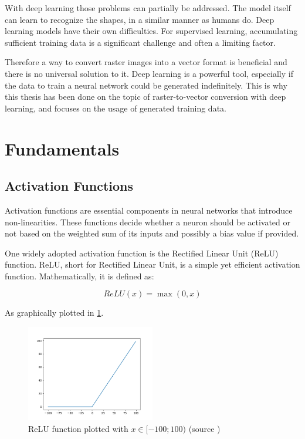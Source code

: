 \documentclass[12pt, a4paper, titlepage]{report}
\begin{document}
With deep learning those problems can partially be addressed. The model itself can learn to recognize the shapes, in a similar manner as humans do. Deep learning models have their own difficulties. For supervised learning, accumulating sufficient training data is a significant challenge and often a limiting factor.

Therefore a way to convert raster images into a vector format is beneficial and there is no universal solution to it. Deep learning is a powerful tool, especially if the data to train a neural network could be generated indefinitely.
This is why this thesis has been done on the topic of raster-to-vector conversion with deep learning, and focuses on the usage of generated training data.



\section{Fundamentals}

\subsection{Activation Functions}


Activation functions are essential components in neural networks that introduce non-linearities. These functions decide whether a neuron should be activated or not based on the weighted sum of its inputs and possibly a bias value if provided.

One widely adopted activation function is the Rectified Linear Unit (ReLU) function.
ReLU, short for Rectified Linear Unit, is a simple yet efficient activation function. Mathematically, it is defined as:

\[ ReLU(x) = \max(0, x) \]

As graphically plotted in \ref{fig:relu_function}.

\begin{figure}[h]
   \centering
   \includegraphics[width=0.5\textwidth]{../rc/images/graph_relu_function.png}
   \caption{ReLU function plotted with $x \in {[-100; 100)}$ (source \cite{graph_relu_function})}
   \label{fig:relu_function}
\end{figure}
\end{document}
